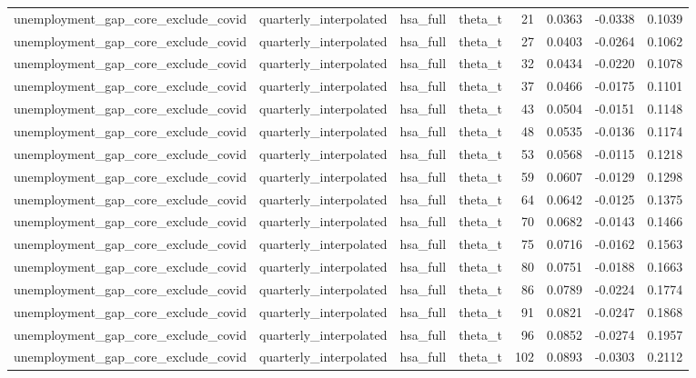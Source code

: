 \begin{tabular}{llllrrrr}
unemployment\_gap\_core\_exclude\_covid & quarterly\_interpolated & hsa\_full & theta\_t & 21 & 0.0363 & -0.0338 & 0.1039 \\
unemployment\_gap\_core\_exclude\_covid & quarterly\_interpolated & hsa\_full & theta\_t & 27 & 0.0403 & -0.0264 & 0.1062 \\
unemployment\_gap\_core\_exclude\_covid & quarterly\_interpolated & hsa\_full & theta\_t & 32 & 0.0434 & -0.0220 & 0.1078 \\
unemployment\_gap\_core\_exclude\_covid & quarterly\_interpolated & hsa\_full & theta\_t & 37 & 0.0466 & -0.0175 & 0.1101 \\
unemployment\_gap\_core\_exclude\_covid & quarterly\_interpolated & hsa\_full & theta\_t & 43 & 0.0504 & -0.0151 & 0.1148 \\
unemployment\_gap\_core\_exclude\_covid & quarterly\_interpolated & hsa\_full & theta\_t & 48 & 0.0535 & -0.0136 & 0.1174 \\
unemployment\_gap\_core\_exclude\_covid & quarterly\_interpolated & hsa\_full & theta\_t & 53 & 0.0568 & -0.0115 & 0.1218 \\
unemployment\_gap\_core\_exclude\_covid & quarterly\_interpolated & hsa\_full & theta\_t & 59 & 0.0607 & -0.0129 & 0.1298 \\
unemployment\_gap\_core\_exclude\_covid & quarterly\_interpolated & hsa\_full & theta\_t & 64 & 0.0642 & -0.0125 & 0.1375 \\
unemployment\_gap\_core\_exclude\_covid & quarterly\_interpolated & hsa\_full & theta\_t & 70 & 0.0682 & -0.0143 & 0.1466 \\
unemployment\_gap\_core\_exclude\_covid & quarterly\_interpolated & hsa\_full & theta\_t & 75 & 0.0716 & -0.0162 & 0.1563 \\
unemployment\_gap\_core\_exclude\_covid & quarterly\_interpolated & hsa\_full & theta\_t & 80 & 0.0751 & -0.0188 & 0.1663 \\
unemployment\_gap\_core\_exclude\_covid & quarterly\_interpolated & hsa\_full & theta\_t & 86 & 0.0789 & -0.0224 & 0.1774 \\
unemployment\_gap\_core\_exclude\_covid & quarterly\_interpolated & hsa\_full & theta\_t & 91 & 0.0821 & -0.0247 & 0.1868 \\
unemployment\_gap\_core\_exclude\_covid & quarterly\_interpolated & hsa\_full & theta\_t & 96 & 0.0852 & -0.0274 & 0.1957 \\
unemployment\_gap\_core\_exclude\_covid & quarterly\_interpolated & hsa\_full & theta\_t & 102 & 0.0893 & -0.0303 & 0.2112 \\

\end{tabular}
